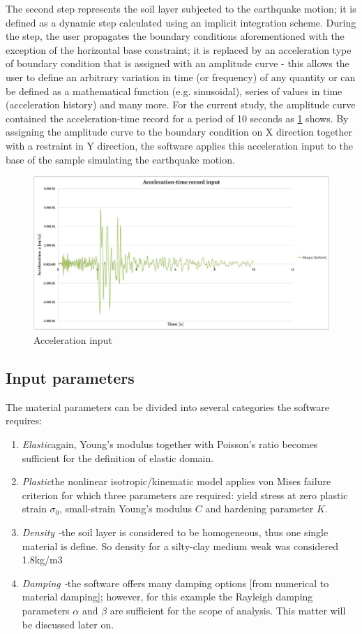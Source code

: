 \documentclass[10pt,a4paper]{report}
\begin{document}
The second step represents the soil layer subjected to the earthquake motion; it is defined as a dynamic step calculated using an implicit integration scheme. During the step, the user propagates the boundary conditions aforementioned with the exception of the horizontal base constraint; it is replaced by an acceleration type of boundary condition that is assigned with an amplitude curve - this allows the user to define an arbitrary variation in time (or frequency) of any quantity or can be defined as a mathematical function (e.g. sinusoidal), series of values in time (acceleration history) and many more. For the current study, the amplitude curve contained the acceleration-time record for a period of 10 seconds as \ref{Acceleration} shows. By assigning the amplitude curve to the boundary condition on X direction together with a restraint in Y direction, the software applies this acceleration input to the base of the sample simulating the earthquake motion.

\begin{figure}[h!]
	\centering
	\includegraphics[width=0.7\linewidth]{"Acc input"}
	\caption{Acceleration input}
	\label{Acceleration}
\end{figure}


	\subsection{Input parameters}
The material parameters can be divided into several categories the software requires:
\begin{enumerate}
	\item \textit{Elastic}\quad again, Young's modulus together with Poisson's ratio becomes sufficient for the definition of elastic domain.
	\item \textit{Plastic}\quad the nonlinear isotropic/kinematic model applies von Mises failure criterion for which three parameters are required: yield stress at zero plastic strain $\sigma_0$, small-strain Young's modulus $C$ and hardening parameter $K$.
	\item\textit{Density -}\quad the soil layer is considered to be homogeneous, thus one single material is define. So density for a silty-clay medium weak was considered 1.8kg/m3
	\item \textit{Damping -}\quad the software offers many damping options [from numerical to material damping]; however, for this example the Rayleigh damping parameters $\alpha$ and $\beta$ are sufficient for the scope of analysis. This matter will be discussed later on.
\end{enumerate}
\end{document}
